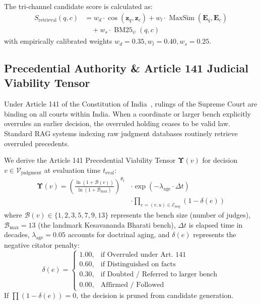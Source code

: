 \documentclass[conference]{IEEEtran}
\begin{document}
The tri-channel candidate score is calculated as:
\begin{equation}
\begin{aligned}
S_{\text{retrieval}}(q, c) &= w_d \cdot \cos(\mathbf{z}_q, \mathbf{z}_c) + w_l \cdot \operatorname{MaxSim}(\mathbf{E}_q, \mathbf{E}_c) \\
&\quad + w_s \cdot \operatorname{BM25}_{\psi}(q, c)
\end{aligned}
\end{equation}
with empirically calibrated weights $w_d = 0.35, w_l = 0.40, w_s = 0.25$.

\subsection{Precedential Authority \& Article 141 Judicial Viability Tensor}
Under Article 141 of the Constitution of India~\cite{constitution1950}, rulings of the Supreme Court are binding on all courts within India. When a coordinate or larger bench explicitly overrules an earlier decision, the overruled holding ceases to be valid law. Standard RAG systems indexing raw judgment databases routinely retrieve overruled precedents.

We derive the Article 141 Precedential Viability Tensor $\mathbf{\Upsilon}(v)$ for decision $v \in \mathcal{V}_{\text{judgment}}$ at evaluation time $t_{\text{eval}}$:
\begin{equation}
\begin{aligned}
\mathbf{\Upsilon}(v) = \left( \frac{\ln(1 + \mathcal{B}(v))}{\ln(1 + \mathcal{B}_{\max})} \right)^{\theta_1} &\cdot \exp\left(-\lambda_{\text{age}} \cdot \Delta t\right) \\
&\cdot \prod_{e = (v, u) \in \mathcal{E}_{\text{neg}}} \left(1 - \delta(e)\right)
\end{aligned}
\end{equation}
where $\mathcal{B}(v) \in \{1, 2, 3, 5, 7, 9, 13\}$ represents the bench size (number of judges), $\mathcal{B}_{\max} = 13$ (the landmark Kesavananda Bharati bench), $\Delta t$ is elapsed time in decades, $\lambda_{\text{age}} = 0.05$ accounts for doctrinal aging, and $\delta(e)$ represents the negative citator penalty:
$$\delta(e) = \begin{cases}
1.00, & \text{if Overruled under Art. 141} \\
0.60, & \text{if Distinguished on facts} \\
0.30, & \text{if Doubted / Referred to larger bench} \\
0.00, & \text{Affirmed / Followed}
\end{cases}$$
If $\prod (1 - \delta(e)) = 0$, the decision is pruned from candidate generation.
\end{document}
